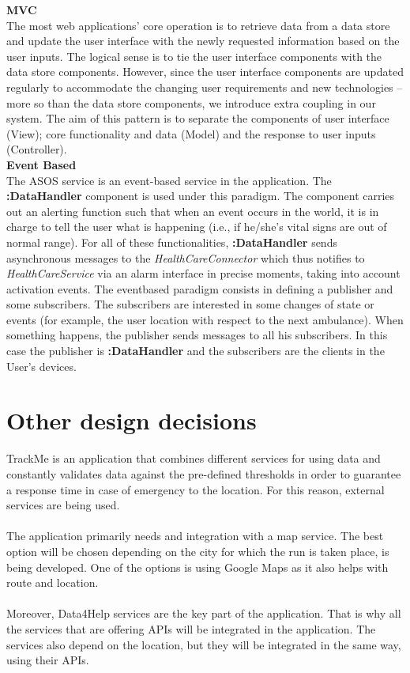 \documentclass[a4paper, hidelinks, 12pt]{report}
\begin{document}
\textbf{MVC}\\
The most web applications’ core operation is to retrieve data from a data store and update the user interface with the newly requested information based on the user inputs. The logical sense is to tie the user interface components with the data store components. However, since the user interface components are updated regularly to accommodate the changing user requirements and new technologies – more so than the data store components, we introduce extra coupling in our system. The aim of this pattern is to separate the components of user interface (View); core functionality and data (Model) and the response to user inputs (Controller).\\

\textbf{Event Based}\\
The ASOS service is an event-based service in the application. The \textbf{:DataHandler} component is used under this paradigm. The component carries out an alerting function such that when an event occurs in the world, it is in charge to tell the user what is happening (i.e., if he/she's vital signs are out of normal range). For all of these functionalities, \textbf{:DataHandler} sends asynchronous messages to the \textit{HealthCareConnector} which thus notifies to \textit{HealthCareService} via an alarm interface in precise moments, taking into account activation events. The eventbased
paradigm consists in defining a publisher and some subscribers. The subscribers are interested in some changes of state or events (for example, the user location with respect to the next ambulance). When something happens, the publisher sends messages to all his subscribers. In this case the publisher is \textbf{:DataHandler} and the subscribers are the clients in the User’s devices.

	\section{Other design decisions}
	TrackMe is an application that combines different services for using data and constantly validates data against the pre-defined thresholds in order to guarantee a response time in case of emergency to the location. For this reason, external services are being used.\\\\
The application primarily needs and integration with a map service. The best option will be chosen depending on the city for which the run is taken place, is being developed. One of the options is using Google Maps as it also helps with route and location.\\\\
Moreover, Data4Help services are the key part of the   application. That is why all the services that are offering APIs will be integrated in the application. The services also depend on the location, but they will be integrated in the same way, using their APIs.
	
\end{document}
